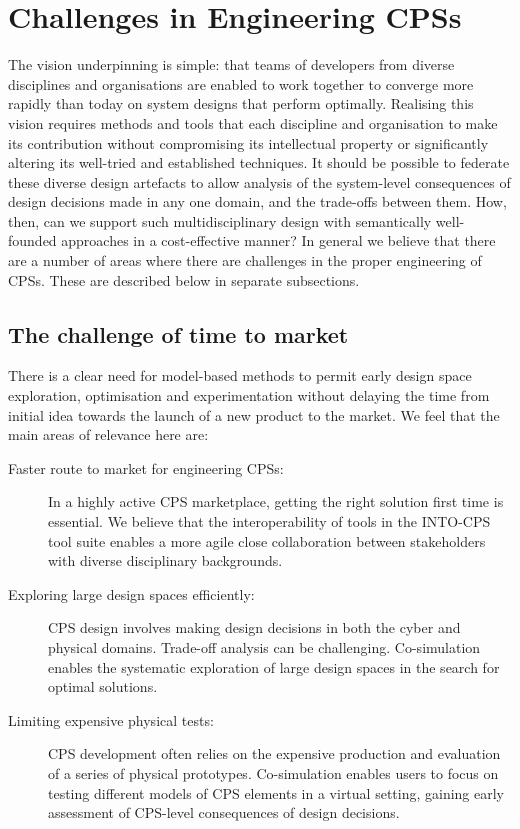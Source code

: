 \section{Challenges in Engineering CPSs}\label{sec:challenges}


The vision underpinning \into is simple: that teams of developers from diverse disciplines and organisations are enabled to work together to converge more rapidly than today on system designs that perform optimally. Realising this vision requires methods and tools that each discipline and organisation to make its contribution without compromising its intellectual property or significantly altering its well-tried and established techniques. It should be possible to federate these diverse design artefacts to allow analysis of the system-level consequences of design decisions made in any one domain, and the trade-offs between them. How, then, can we support such multidisciplinary design with semantically well-founded approaches in a cost-effective manner? In general we believe that there are a number of areas where there are challenges in the proper engineering of CPSs. These are described below in separate subsections.

\subsection{The challenge of time to market}

There is a clear need for model-based methods to permit early design space exploration, optimisation and experimentation without delaying the time from initial idea towards the launch of a new product to the market. We feel that the main areas of relevance here are:

\begin{description}
\item[Faster route to market for engineering CPSs:] In a highly active CPS marketplace, getting the right solution first time is essential. We believe that the interoperability of tools in the INTO-CPS tool suite enables a more agile close collaboration between stakeholders with diverse disciplinary backgrounds. 
\item[Exploring large design spaces efficiently:] CPS design involves making design decisions in both the cyber and physical domains. Trade-off analysis can be challenging. Co-simulation enables the systematic exploration of large design spaces in the search for optimal solutions. 
\item[Limiting expensive physical tests:] CPS development often relies on the expensive production and evaluation of a series of physical prototypes. Co-simulation enables users to focus on testing different models of CPS elements in a virtual setting, gaining early assessment of CPS-level consequences of design decisions.
\end{description}

